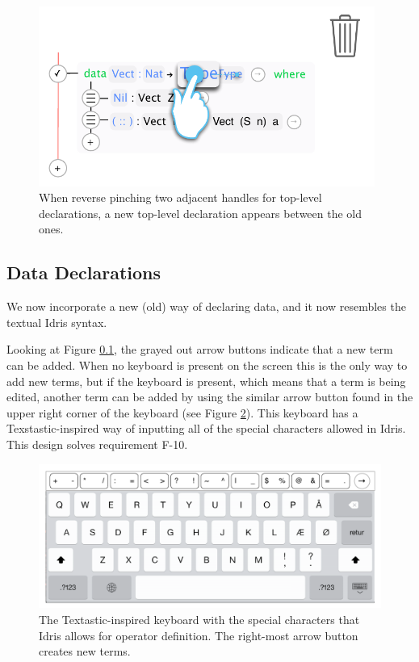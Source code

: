 \begin{figure}
	\centering
		\includegraphics[width=110mm]{diagrams/design_drag_to_garbage.pdf}
	\caption{When reverse pinching two adjacent handles for top-level
	declarations, a new top-level declaration appears between the old ones.}
\label{fig:design_drag_to_garbage}
\end{figure}

\subsection{Data Declarations}
\label{subsec:new_design_data_dec}
We now incorporate a new (old) way of
declaring data, and it now resembles the textual Idris syntax. 

Looking at Figure \ref{subsec:new_design_data_dec}, the grayed out arrow buttons indicate that a new term can be added. When no
keyboard is present on the screen this is the only way to add new terms, but if
the keyboard is present, which means that a term is being edited, another term
can be added by using the similar arrow button found in the upper right corner
of the keyboard (see Figure \ref{fig:design_keyboard}). This keyboard has a
Texstastic-inspired way of inputting all of the special characters allowed in
Idris. This design solves requirement F-10.

\begin{figure}
	\centering
		\includegraphics[width=115mm]{diagrams/design_keyboard.pdf}
	\caption{The Textastic-inspired keyboard with the special characters that
	Idris allows for operator definition. The right-most arrow button creates new
	terms.}
\label{fig:design_keyboard}
\end{figure}



